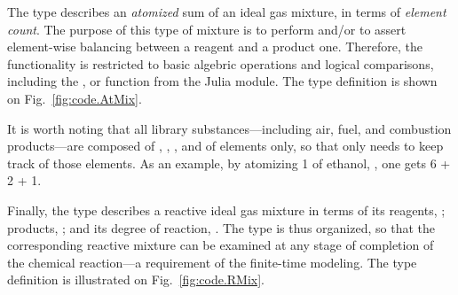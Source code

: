     The  type describes an \emph{atomized} sum of an ideal gas mixture, in terms of \emph{element count}. The purpose of this type  of  mixture  is  to  perform  and/or  to  assert
    element-wise balancing between a reagent  and a product one. Therefore, the  functionality is restricted to  basic  algebric  operations  and  logical  comparisons,
    including the , or \code{$\approx$()} function from the  Julia module. The  type definition is shown on Fig.~\ref{fig:code.AtMix}.


    It is worth noting that all library substances---including air, fuel, and combustion products---are composed of , , , and of  elements only,  so  that  
    only needs to keep track of those elements. As an example, by atomizing \unit{1}{\kilo\mole} of ethanol, , one gets 6 + 2 + 1.

    Finally, the  type describes a reactive ideal gas mixture in terms of its reagents, ; products, ; and its degree of reaction, . The type is thus
    organized, so that the corresponding reactive mixture can be examined at any stage of completion of the chemical reaction---a requirement of the finite-time modeling. The  type  definition
    is illustrated on Fig.~\ref{fig:code.RMix}.


